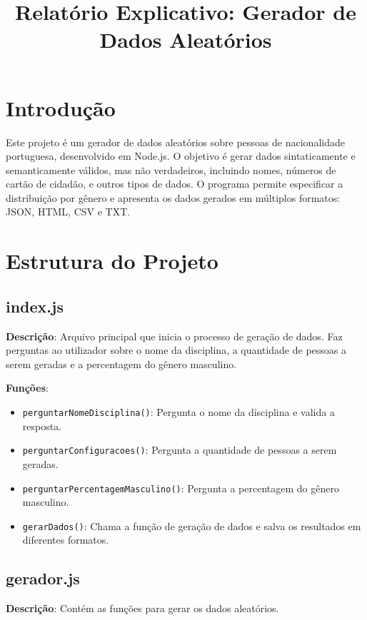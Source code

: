 \documentclass{article}
\title{Relatório Explicativo: Gerador de Dados Aleatórios}
\author{}
\date{}
\begin{document}
\maketitle

\section{Introdução}
Este projeto é um gerador de dados aleatórios sobre pessoas de nacionalidade portuguesa, desenvolvido em Node.js. O objetivo é gerar dados sintaticamente e semanticamente válidos, mas não verdadeiros, incluindo nomes, números de cartão de cidadão, e outros tipos de dados. O programa permite especificar a distribuição por gênero e apresenta os dados gerados em múltiplos formatos: JSON, HTML, CSV e TXT.

\section{Estrutura do Projeto}

\subsection{index.js}
\textbf{Descrição}: Arquivo principal que inicia o processo de geração de dados. Faz perguntas ao utilizador sobre o nome da disciplina, a quantidade de pessoas a serem geradas e a percentagem do gênero masculino.

\textbf{Funções}:
\begin{itemize}
    \item \texttt{perguntarNomeDisciplina()}: Pergunta o nome da disciplina e valida a resposta.
    \item \texttt{perguntarConfiguracoes()}: Pergunta a quantidade de pessoas a serem geradas.
    \item \texttt{perguntarPercentagemMasculino()}: Pergunta a percentagem do gênero masculino.
    \item \texttt{gerarDados()}: Chama a função de geração de dados e salva os resultados em diferentes formatos.
\end{itemize}

\subsection{gerador.js}
\textbf{Descrição}: Contém as funções para gerar os dados aleatórios.
\end{document}
